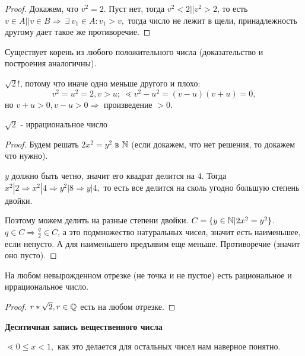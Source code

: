 \documentclass[12pt]{report}
\begin{document}
\begin{defn}[ = Аксиоматический подход к построению $\R$]
\begin{enumerate}
\begin{proof}
Докажем, что $v^2 = 2$. Пуст нет, тогда $v^2 < 2 || v^2 > 2$, то есть $v \in A || v \in B \Rightarrow ~\exists ~v_1 \in A: v_1 > v,$ тогда число не лежит в щели, принадлежность другому дает такое же противоречие.
\end{proof}

\begin{st}
Существует корень из любого положительного числа (доказательство и построения аналогичны).
\end{st}

\begin{rem}
$\sqrt{2} !$, потому что иначе одно меньше другого и плохо:
$$v^2 = u^2 = 2, v > u; ~\lessdot v^2 - u^2 = (v - u)(v + u) = 0,$$
но $v + u > 0, v - u > 0 \Rightarrow$ произведение $>0$.
\end{rem}

\begin{thm}
$\sqrt{2}$ - иррациональное число
\end{thm}
\begin{proof}
Будем решать $2x^2 = y^2$ в $\mathbb{N}$ (если докажем, что нет решения, то докажем что нужно). 

$y$ должно быть четно, значит его квадрат делится на $4$. Тогда $x^2 | 2 \Rightarrow x^2 | 4 \Rightarrow y^2 | 8 \Rightarrow y | 4,$ то есть все делится на сколь угодно большую степень двойки. 

Поэтому можем делить на разные степени двойки. $C = \{y \in \mathbb{N}|2x^2 = y^2\}$. $q \in C \Rightarrow \frac{q}{2} \in C$, а это подмножество натуральных чисел, значит есть наименьшее, если непусто. А для наименьшего предъявим еще меньше. Противоречие (значит оно пусто).
\end{proof}

\begin{cor}
На любом невырожденном отрезке (не точка и не пустое) есть рациональное и иррациональное число.
\end{cor}
\begin{proof}
$r * \sqrt{2}, r \in \mathbb{Q}$ есть на любом отрезке.
\end{proof}
\end{enumerate}
\end{defn}

\begin{center}
{\bfseries Десятичная запись вещественного числа}
\end{center}

$\lessdot 0 \le x < 1,$ как это делается для остальных чисел нам наверное понятно.
\end{document}
